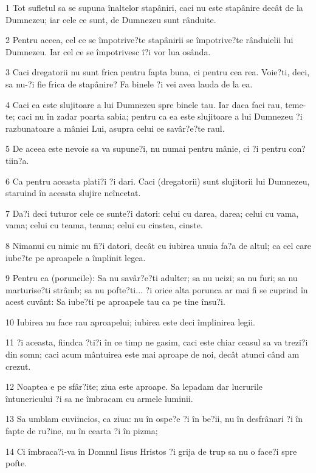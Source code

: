 \par 1 Tot sufletul sa se supuna înaltelor stapâniri, caci nu este stapânire decât de la Dumnezeu; iar cele ce sunt, de Dumnezeu sunt rânduite.
\par 2 Pentru aceea, cel ce se împotrive?te stapânirii se împotrive?te rânduielii lui Dumnezeu. Iar cel ce se împotrivesc î?i vor lua osânda.
\par 3 Caci dregatorii nu sunt frica pentru fapta buna, ci pentru cea rea. Voie?ti, deci, sa nu-?i fie frica de stapânire? Fa binele ?i vei avea lauda de la ea.
\par 4 Caci ea este slujitoare a lui Dumnezeu spre binele tau. Iar daca faci rau, teme-te; caci nu în zadar poarta sabia; pentru ca ea este slujitoare a lui Dumnezeu ?i razbunatoare a mâniei Lui, asupra celui ce savâr?e?te raul.
\par 5 De aceea este nevoie sa va supune?i, nu numai pentru mânie, ci ?i pentru con?tiin?a.
\par 6 Ca pentru aceasta plati?i ?i dari. Caci (dregatorii) sunt slujitorii lui Dumnezeu, staruind în aceasta slujire neîncetat.
\par 7 Da?i deci tuturor cele ce sunte?i datori: celui cu darea, darea; celui cu vama, vama; celui cu teama, teama; celui cu cinstea, cinste.
\par 8 Nimanui cu nimic nu fi?i datori, decât cu iubirea unuia fa?a de altul; ca cel care iube?te pe aproapele a împlinit legea.
\par 9 Pentru ca (poruncile): Sa nu savâr?e?ti adulter; sa nu ucizi; sa nu furi; sa nu marturise?ti strâmb; sa nu pofte?ti... ?i orice alta porunca ar mai fi se cuprind în acest cuvânt: Sa iube?ti pe aproapele tau ca pe tine însu?i.
\par 10 Iubirea nu face rau aproapelui; iubirea este deci împlinirea legii.
\par 11 ?i aceasta, fiindca ?ti?i în ce timp ne gasim, caci este chiar ceasul sa va trezi?i din somn; caci acum mântuirea este mai aproape de noi, decât atunci când am crezut.
\par 12 Noaptea e pe sfâr?ite; ziua este aproape. Sa lepadam dar lucrurile întunericului ?i sa ne îmbracam cu armele luminii.
\par 13 Sa umblam cuviincios, ca ziua: nu în ospe?e ?i în be?ii, nu în desfrânari ?i în fapte de ru?ine, nu în cearta ?i în pizma;
\par 14 Ci îmbraca?i-va în Domnul Iisus Hristos ?i grija de trup sa nu o face?i spre pofte.

